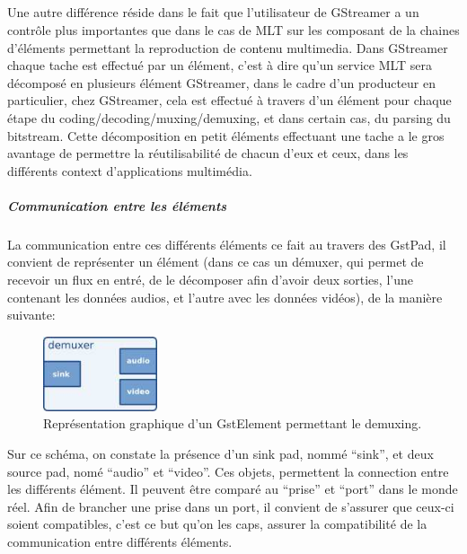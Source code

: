 \subparagraph{}

Une autre différence réside dans le fait que l'utilisateur de
GStreamer a un contrôle plus importantes que dans le cas de MLT sur
les composant de la chaines d'éléments permettant la reproduction de
contenu multimedia.  Dans GStreamer chaque tache est effectué par un
élément, c'est à dire qu'un service MLT sera décomposé en plusieurs
élément GStreamer, dans le cadre d'un producteur en particulier, chez
GStreamer, cela est effectué à travers d'un élément pour chaque étape
du coding/decoding/muxing/demuxing, et dans certain cas, du parsing du
bitstream. Cette décomposition en petit éléments effectuant une tache
a le gros avantage de permettre la réutilisabilité de chacun d'eux et
ceux, dans les différents  context d'applications multimédia.

\subparagraph{Communication entre les éléments}

\subparagraph{}

La communication entre ces différents éléments ce fait au travers des
GstPad, il convient de représenter un élément (dans ce cas un démuxer,
qui permet de recevoir un flux en entré, de le décomposer afin d'avoir
deux sorties, l'une contenant les données audios, et l'autre avec les
données vidéos), de la manière suivante:

\begin{figure} [H]

  \begin{center}

    \includegraphics[width=0.30\textwidth]{images/gstdemuxer}

  \end{center}

  \caption{Représentation graphique d'un GstElement permettant le
  demuxing.}

  \label{Yes}

\end{figure}

Sur ce schéma, on constate la présence d'un sink pad, nommé ``sink'',
et deux source pad, nomé ``audio'' et ``video''. Ces objets, permettent
la connection entre les différents élément. Il peuvent être comparé
au ``prise'' et ``port'' dans le monde réel.  Afin de brancher une prise
dans un port, il convient de s'assurer que ceux-ci soient compatibles,
c'est ce but qu'on les caps, assurer la compatibilité de la communication
entre différents éléments.

